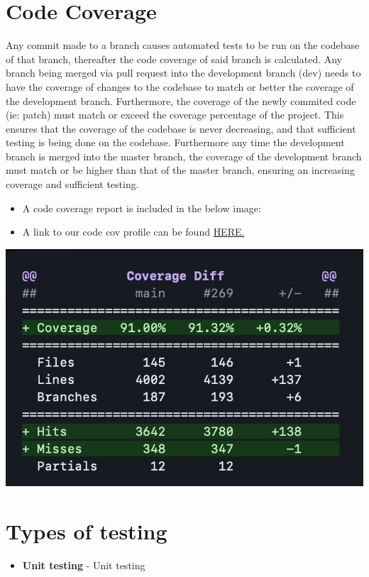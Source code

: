 \documentclass[12pt]{article}
\begin{document}
\section{Code Coverage}
Any commit made to a branch causes automated tests to be run on the codebase of that branch, thereafter the code coverage of said branch is calculated.
Any branch being merged via pull request into the development branch (dev) needs to have the coverage of changes to the codebase to match or better the coverage of the development branch.
Furthermore, the coverage of the newly commited code (ie: patch) must match or exceed the coverage percentage of the project.
This ensures that the coverage of the codebase is never decreasing, and that sufficient testing is being done on the codebase.
Furthermore any time the development branch is merged into the master branch, the coverage of the development branch must match or be higher than that of the master branch, ensuring an increasing coverage and sufficient testing.
\begin{itemize}
    \item A code coverage report is included in the below image:
    \item A link to our code cov profile can be found \href{https://codecov.io/gh/COS301-SE-2023/Domain-Pulse-A-Sentiment-Analysis-Platform}{HERE.}
\end{itemize}
\includegraphics[width=\textwidth]{codecovReport.png}

\newpage
\section{Types of testing}
\begin{itemize}
    \item \textbf{Unit testing} - Unit testing 
\end{itemize}
\end{document}

